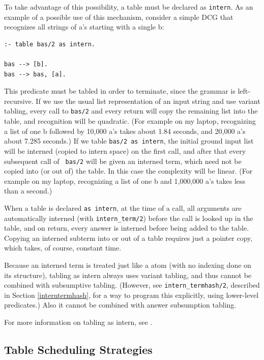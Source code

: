 To take advantage of this possibility, a table must be declared as
{\tt intern}.  As an example of a possible use of this mechanism,
consider a simple DCG that recognizes all strings of a's starting with
a single b:
\begin{verbatim}
:- table bas/2 as intern.

bas --> [b].
bas --> bas, [a].
\end{verbatim}
This predicate must be tabled in order to terminate, since the grammar
is left-recursive.  If we use the usual list representation of an
input string and use variant tabling, every call to {\tt bas/2} and
every return will copy the remaining list into the table, and
recognition will be quadratic.  (For example on my laptop, recognizing
a list of one b followed by 10,000 a's takes about 1.84 seconds, and
20,000 a's about 7.285 seconds.)  If we table {\tt bas/2 as intern},
the initial ground input list will be interned (copied to intern
space) on the first call, and after that every subsequent call of {\tt
bas/2} will be given an interned term, which need not be copied into
(or out of) the table.  In this case the complexity will be linear.
(For example on my laptop, recognizing a list of one b and 1,000,000
a's takes less than a second.)

When a table is declared {\tt as intern}, at the time of a call, all
arguments are automatically interned (with {\tt intern\_term/2})
before the call is looked up in the table, and on return, every answer
is interned before being added to the table.  Copying an interned
subterm into or out of a table requires just a pointer copy, which takes,
of course, constant time.

Because an interned term is treated just like a atom (with no indexing
done on its structure), tabling as intern always uses variant tabling,
and thus cannot be combined with subsumptive tabling.  (However, see
{\tt intern\_termhash/2}, described in Section \ref{interntermhash},
for a way to program this explicitly, using lower-level predicates.)
Also it cannot be combined with answer subsumption tabling.

For more information on tabling as intern, see
\cite{ciclops-2013-interning}.



\subsection{Table Scheduling Strategies} \label{section:scheduling}

